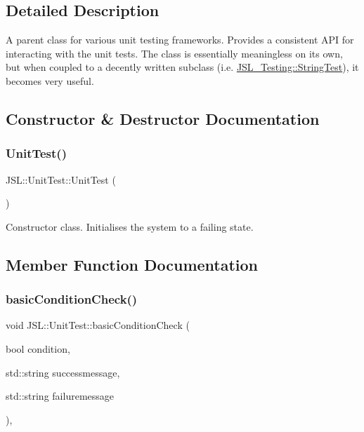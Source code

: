 \subsection{Detailed Description}
A parent class for various unit testing frameworks. Provides a consistent A\+PI for interacting with the unit tests. The class is essentially meaningless on its own, but when coupled to a decently written subclass (i.\+e. \hyperlink{classJSL__Testing_1_1StringTest}{J\+S\+L\+\_\+\+Testing\+::\+String\+Test}), it becomes very useful. 

\subsection{Constructor \& Destructor Documentation}
\mbox{\label{classJSL_1_1UnitTest_aa3bc8d5c99696d5bc6e63b8da358a0ed}} 
\subsubsection{\texorpdfstring{Unit\+Test()}{UnitTest()}}
{\footnotesize\ttfamily J\+S\+L\+::\+Unit\+Test\+::\+Unit\+Test (\begin{DoxyParamCaption}{ }\end{DoxyParamCaption})\hspace{0.3cm}{\ttfamily [inline]}}



Constructor class. Initialises the system to a failing state. 



\subsection{Member Function Documentation}
\mbox{\label{classJSL_1_1UnitTest_a3629d1bca071da7a2af6b7de29be1430}} 
\subsubsection{\texorpdfstring{basic\+Condition\+Check()}{basicConditionCheck()}\hspace{0.1cm}{\footnotesize\ttfamily [1/2]}}
{\footnotesize\ttfamily void J\+S\+L\+::\+Unit\+Test\+::basic\+Condition\+Check (\begin{DoxyParamCaption}\item[{bool}]{condition,  }\item[{std\+::string}]{successmessage,  }\item[{std\+::string}]{failuremessage }\end{DoxyParamCaption})\hspace{0.3cm}{\ttfamily [inline]}, {\ttfamily [protected]}}

